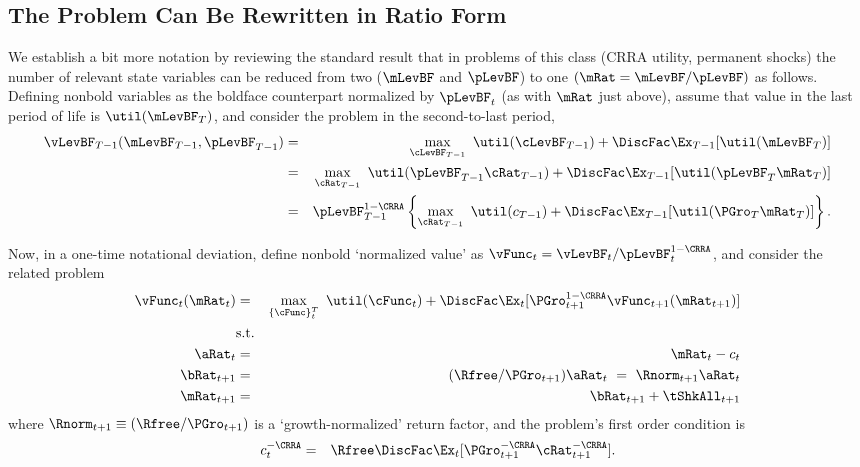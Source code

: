 \documentclass[titlepage]{\econtex}\providecommand{\texname}{BufferStockTheory}
\begin{document}
\subsection{The Problem Can Be Rewritten in Ratio Form}

\label{subsec:ratio}

We establish a bit more notation by reviewing the standard result that in problems of this class (CRRA utility, permanent shocks) the number of relevant state variables can be reduced from two ($\mLevBF$ and $\pLevBF$) to one $(\mRat = \mLevBF/\pLevBF)$ as follows.  Defining nonbold variables as the boldface counterpart normalized by $\pLevBF_{t}$ (as with $\mRat$ just above), assume that value in the last period of life is $\util(\mLevBF_{T})$, and consider the problem in the second-to-last period,
\begin{eqnarray}
\vLevBF_{T-1}(\mLevBF_{T-1},\pLevBF_{T-1}) &=&
\max_{\cLevBF_{T-1}}~ \util(\cLevBF_{T-1}) +\DiscFac \Ex_{T-1} [ \util(\mLevBF_{T})]
\notag \\
& = &  \max_{\cRat_{T-1}}~
\util(\pLevBF_{T-1}\cRat_{T-1}) + \DiscFac  \Ex_{T-1} [\util(\pLevBF_{T}{\mRat}
_{T})]  \notag \\
& = & \pLevBF_{T-1}^{1-\CRRA}
\left\{\max_{\cRat_{T-1}}~ \util(c_{T-1}) + \DiscFac \Ex_{T-1} [ \util( {\PGro}_{T}
{\mRat}_{T}) ] \right\}  . \label{eq:vBold}
\end{eqnarray}


\hypertarget{The-Related-Problem}{}
Now, in a one-time notational deviation, define nonbold `normalized value' as $\vFunc_{t} = \vLevBF_{t}/\pLevBF_{t}^{1-\CRRA}$, and consider the related problem 
\begin{eqnarray}
\vFunc_{t}(\mRat_{t}) & = & \max_{\{\cFunc\}_{t}^{T}}~  \util(\cFunc_{t}) +\DiscFac \Ex_{t}[\PGro_{t+1}^{1-\CRRA}\vFunc_{t+1}({\mRat}_{t+1})] \notag \\
& \mbox{s.t.} &  \label{eq:veqn} \notag 
 \\ {\aRat}_{t} & = & \mRat_{t}-c_{t}  \notag
 \\ {\bRat}_{t+1} & = & (\Rfree/\PGro_{t+1})\aRat_{t}  ~ = ~ \Rnorm_{t+1}\aRat_{t}  \notag
\\ \mRat_{t+1} & = & \bRat_{t+1}+\tShkAll_{t+1}  \notag %
\end{eqnarray}
where $\Rnorm_{t+1}\equiv (\Rfree/\PGro_{t+1})$ is a `growth-normalized' return factor, and the problem's first order condition is
\begin{eqnarray}
c_{t}^{-\CRRA} & = & \Rfree \DiscFac \Ex_{t}[ {\PGro}_{t+1}^{-\CRRA} {\cRat}
_{t+1}^{-\CRRA}].  \label{eq:scaledeuler}
\end{eqnarray}
\end{document}
